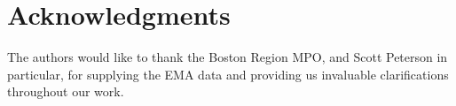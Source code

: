 \documentclass[3p]{elsarticle}
\begin{document}
	
	\section*{Acknowledgments}
	
	The authors would like to thank the Boston Region MPO, and Scott Peterson in particular, for supplying the EMA data and providing us invaluable clarifications throughout our work. 
	
	

	\clearpage
	
	
%	
	


	
	
	
	
\end{document}
